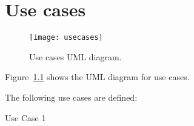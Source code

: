 \chapter{Use cases}\label{ch:usecases}

\begin{figure}[p]
	\texttt{[image: usecases]}
	\caption{Use cases UML diagram.}
	\label{fig:usecases}
\end{figure}

Figure~\ref{fig:usecases} shows the UML diagram for use cases.

The following use cases are defined:
\begin{description}
	\item[Use Case 1] \textellipsis
\end{description}
